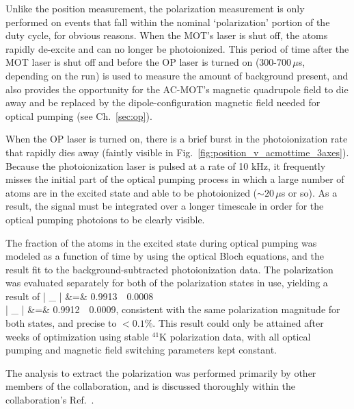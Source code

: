 Unlike the position measurement, the polarization measurement is only performed on events that fall within the nominal `polarization' portion of the duty cycle, for obvious reasons.  When the MOT's laser is shut off, the atoms rapidly de-excite and can no longer be photoionized.  This period of time after the MOT laser is shut off and before the \ac{OP} laser is turned on (300-700$\,\mu$s, depending on the run) is used to measure the amount of background present, and also provides the opportunity for the AC-MOT's magnetic quadrupole field to die away and be replaced by the dipole-configuration magnetic field needed for optical pumping (see Ch.~\ref{sec:op}).  

When the \ac{OP} laser is turned on, there is a brief burst in the photoionization rate that rapidly dies away (faintly visible in Fig.~\ref{fig:position_v_acmottime_3axes}).  Because the photoionization laser is pulsed at a rate of 10 kHz, it frequently misses the initial part of the optical pumping process in which a large number of atoms are in the excited state and able to be photoionized ($\sim 20\,\mu$s or so).  As a result, the signal must be integrated over a longer timescale in order for the optical pumping photoions to be clearly visible.

The fraction of the atoms in the excited state during optical pumping was modeled as a function of time by using the optical Bloch equations, and the result fit to the background-subtracted photoionization data.  The polarization was evaluated separately for both of the polarization states in use, yielding a result of
\bea
| \vecP_{\bm{+}} | &=& 0.9913 \,\pm\, 0.0008
\\
| \vecP_{\bm{-}} | &=& 0.9912 \,\pm\, 0.0009, 
\eea
consistent with the same polarization magnitude for both states, and precise to \mbox{$<0.1\%$}.  This result could only be attained after weeks of optimization using \mbox{stable} $^{41}$K polarization data, with all optical pumping and magnetic field switching parameters kept constant.

The analysis to extract the polarization was performed primarily by other members of the collaboration, and is discussed thoroughly within the collaboration's Ref.~\cite{ben_OP}.


